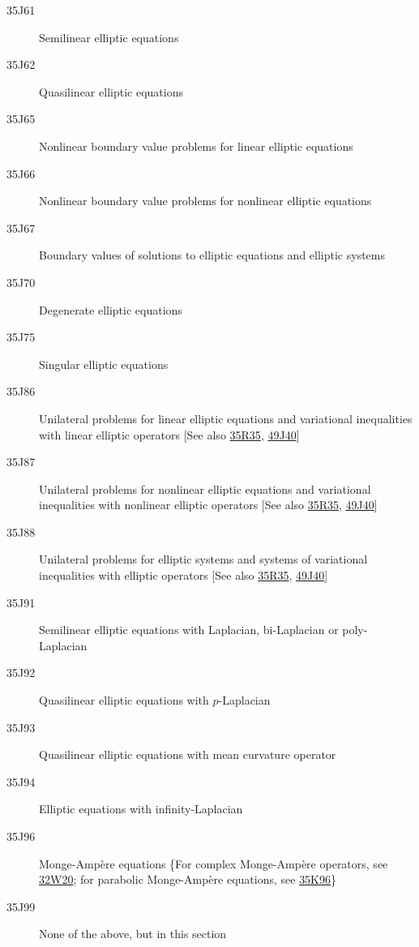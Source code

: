 \documentclass[letterpaper]{article}
\begin{document}
\begin{description}
\item [35J61]\label{35J61} Semilinear elliptic  equations
\item [35J62]\label{35J62} Quasilinear elliptic  equations
\item [35J65]\label{35J65} Nonlinear boundary value problems for linear elliptic  equations
\item [35J66]\label{35J66} Nonlinear boundary value problems for nonlinear elliptic  equations
\item [35J67]\label{35J67} Boundary values of solutions to elliptic  equations and  elliptic systems
\item [35J70]\label{35J70} Degenerate elliptic  equations
\item [35J75]\label{35J75} Singular elliptic  equations
\item [35J86]\label{35J86} Unilateral problems for linear elliptic  equations and variational inequalities with linear elliptic  operators [See also \hyperref[35R35]{35R35}, \hyperref[49J40]{49J40}]
\item [35J87]\label{35J87} Unilateral problems for nonlinear elliptic  equations and variational inequalities with nonlinear elliptic  operators [See also \hyperref[35R35]{35R35}, \hyperref[49J40]{49J40}]
\item [35J88]\label{35J88} Unilateral problems for elliptic systems and  systems of variational inequalities with elliptic  operators [See also \hyperref[35R35]{35R35}, \hyperref[49J40]{49J40}]
\item [35J91]\label{35J91} Semilinear elliptic  equations with Laplacian, bi-Laplacian or poly-Laplacian
\item [35J92]\label{35J92} Quasilinear elliptic  equations with $p$-Laplacian
\item [35J93]\label{35J93} Quasilinear elliptic  equations with mean curvature operator
\item [35J94]\label{35J94} Elliptic  equations with infinity-Laplacian
\item [35J96]\label{35J96} Monge-Amp\`{e}re equations \{For complex Monge-Amp\`{e}re operators, see \hyperref[32W20]{32W20}; for parabolic Monge-Amp\`{e}re equations, see \hyperref[35K96]{35K96}\}
\item [35J99]\label{35J99} None of the above, but in this section
\end{description}
\end{document}
